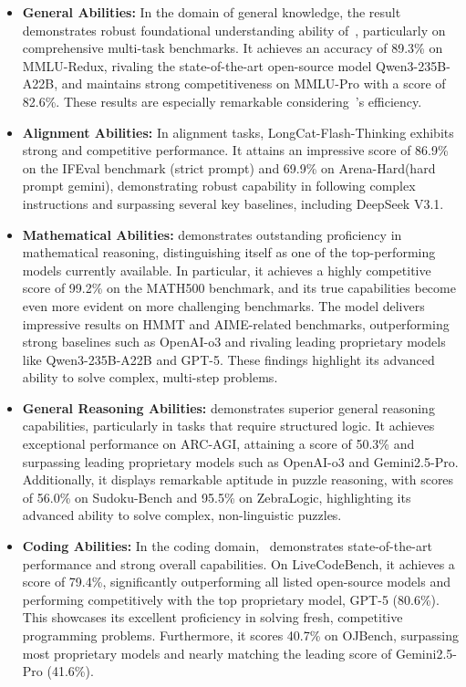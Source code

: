 \begin{itemize}
    \item\textbf{General Abilities: }In the domain of general knowledge, the result demonstrates robust foundational understanding ability of~{\longcatthink}, particularly on comprehensive multi-task benchmarks. 
    It achieves an accuracy of 89.3\% on MMLU-Redux, rivaling the state-of-the-art open-source model Qwen3-235B-A22B, and maintains strong competitiveness on MMLU-Pro with a score of 82.6\%. 
    These results are especially remarkable considering~{\longcatthink}’s efficiency.
    
    \item\textbf{Alignment Abilities: }In alignment tasks, LongCat-Flash-Thinking exhibits strong and competitive performance. It attains an impressive score of 86.9\% on the IFEval benchmark (strict prompt) and 69.9\% on Arena-Hard(hard prompt gemini), demonstrating robust capability in following complex instructions and surpassing several key baselines, including DeepSeek V3.1.
    
    \item\textbf{Mathematical Abilities: }{\longcatthink} demonstrates outstanding proficiency in mathematical reasoning, distinguishing itself as one of the top-performing models currently available. In particular, it achieves a highly competitive score of 99.2\% on the MATH500 benchmark, and its true capabilities become even more evident on more challenging benchmarks. The model delivers impressive results on HMMT and AIME-related benchmarks, outperforming strong baselines such as OpenAI-o3 and rivaling leading proprietary models like Qwen3-235B-A22B and GPT-5. These findings highlight its advanced ability to solve complex, multi-step problems.
    \item\textbf{General Reasoning Abilities: }{\longcatthink} demonstrates superior general reasoning capabilities, particularly in tasks that require structured logic. It achieves exceptional performance on ARC-AGI, attaining a score of 50.3\% and surpassing leading proprietary models such as OpenAI-o3 and Gemini2.5-Pro. Additionally, it displays remarkable aptitude in puzzle reasoning, with scores of 56.0\% on Sudoku-Bench and 95.5\% on ZebraLogic, highlighting its advanced ability to solve complex, non-linguistic puzzles. 
    
    \item\textbf{Coding Abilities: }In the coding domain,~{\longcatthink} 
    demonstrates state-of-the-art performance and strong overall capabilities. On LiveCodeBench, it achieves a score of 79.4\%, significantly outperforming all listed open-source models and performing competitively with the top proprietary model, GPT-5 (80.6\%). This showcases its excellent proficiency in solving fresh, competitive programming problems. 
    Furthermore, it scores 40.7\% on OJBench, surpassing most proprietary models and nearly matching the leading score of Gemini2.5-Pro (41.6\%).
    

\end{itemize}
